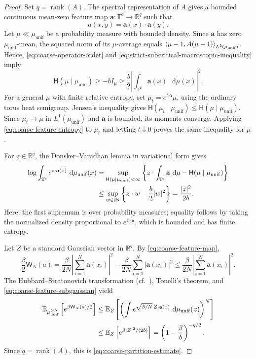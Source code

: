 \documentclass[11pt,reqno]{amsart}
\numberwithin{equation}{section}
\theoremstyle{plain}
\theoremstyle{definition}
\DeclarePairedDelimiter{\ip}{\langle}{\rangle}
\renewcommand{\d}{\mathsf d}
\newcommand{\dd}{\mathop{}\!\mathrm d}
\newcommand{\T}{\mathbb T}
\newcommand{\R}{\mathbb R}
\newcommand{\E}{\mathbb E}
\newcommand{\rank}{\operatorname{rank}}
\newcommand{\be}{\beta}
\newcommand{\Hr}{\mathsf H}
\newcommand{\muunif}{\mu_{\mathrm{unif}}}
\begin{document}
\begin{proof}
Set $q=\rank(A)$. The spectral representation of $A$ gives a bounded continuous mean-zero feature map $\mathbf a:\T^{\d}\to\R^q$ such that
\begin{equation}
 a(x,y)=\mathbf a(x)\cdot\mathbf a(y).
 \label{eq:coarse-feature-map}
\end{equation}
Let $\mu\ll\muunif$ be a probability measure with bounded density. Since $\mathbf a$ has zero $\muunif$-mean, the squared norm of its $\mu$-average equals $\ip*{\mu-1,A(\mu-1)}_{L^2(\muunif)}$. Hence, \eqref{eq:coarse-operator-order} and \eqref{eq:strict-subcritical-macroscopic-inequality} imply
\begin{equation}
 \Hr(\mu\mid\muunif)
 \geq-bI_{\mu}
 \geq\frac b2\left|\int_{\T^{\d}}\mathbf a(x)\,\dd\mu(x)\right|^2.
 \label{eq:coarse-feature-entropy}
\end{equation}
For a general $\mu$ with finite relative entropy, set $\mu_t=e^{t\Delta}\mu$, using the ordinary torus heat semigroup. Jensen's inequality gives $\Hr(\mu_t\mid\muunif)\leq\Hr(\mu\mid\muunif)$. Since $\mu_t\to\mu$ in $L^1(\muunif)$ and $\mathbf a$ is bounded, its moments converge. Applying \eqref{eq:coarse-feature-entropy} to $\mu_t$ and letting $t\downarrow0$ proves the same inequality for $\mu$.

For $z\in\R^q$, the Donsker--Varadhan lemma in variational form gives
\begin{align}
 \log\int_{\T^{\d}}e^{z\cdot\mathbf a(x)}\,\dd\muunif(x)
 &=\sup_{\Hr(\mu\mid\muunif)<\infty}
 \left\{z\cdot\int_{\T^{\d}}\mathbf a\,\dd\mu-\Hr(\mu\mid\muunif)\right\}
 \notag\\
 &\leq\sup_{w\in\R^q}\left\{z\cdot w-\frac b2|w|^2\right\}
 =\frac{|z|^2}{2b}.
 \label{eq:coarse-feature-subgaussian}
\end{align}
Here, the first supremum is over probability measures; equality follows by taking the normalized density proportional to $e^{z\cdot\mathbf a}$, which is bounded and has finite entropy.

Let \(Z\) be a standard Gaussian vector in \(\R^q\).  By \eqref{eq:coarse-feature-map},
\begin{equation}
 \frac\be2\mathsf W_N(a)
 =\frac\be{2N}\left|\sum_{i=1}^N\mathbf a(x_i)\right|^2
 -\frac\be{2N}\sum_{i=1}^N|\mathbf a(x_i)|^2
 \leq\frac\be{2N}\left|\sum_{i=1}^N\mathbf a(x_i)\right|^2.
 \label{eq:coarse-square-completion}
\end{equation}
The Hubbard--Stratonovich transformation (cf.\ \cite[(6.18)--(6.19)]{DelgadinoGvalaniRosenzweig2026}), Tonelli's theorem, and \eqref{eq:coarse-feature-subgaussian} yield
\begin{align}
 \E_{\muunif^{\otimes N}}\left[e^{\be\mathsf W_N(a)/2}\right]
 &\leq\E_Z\left[
 \left(\int e^{\sqrt{\be/N}\,Z\cdot\mathbf a(x)}\,\dd\muunif(x)\right)^N\right]
 \notag\\
 &\leq\E_Z\left[e^{\be|Z|^2/(2b)}\right]
 =\left(1-\frac\be b\right)^{-q/2}.
 \label{eq:coarse-hubbard-stratonovich}
\end{align}
Since $q=\rank(A)$, this is \eqref{eq:coarse-partition-estimate}.
\end{proof}
\end{document}
